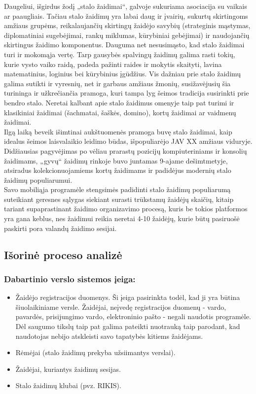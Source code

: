 \documentclass{VUMIFPSkursinis}
\begin{document}
Daugeliui, išgirdus žodį „stalo žaidimai“, galvoje sukuriama asociacija 
su vaikais ar paaugliais. Tačiau stalo žaidimų yra labai daug ir įvairių, 
sukurtų skirtingoms amžiaus grupėms, reikalaujančių skirtingų žaidėjo savybių 
(strateginis mąstymas, diplomatiniai sugebėjimai, rankų miklumas, kūrybiniai 
gebėjimai) ir naudojančių skirtingus žaidimo komponentus. Dauguma net nesusimąsto, 
kad stalo žaidimai turi ir mokomąja vertę. Tarp gausybės spalvingų žaidimų galima 
rasti tokių, kurie vysto vaiko raidą, padeda pažinti raides ir mokytis skaityti, 
lavina matematinius, loginius bei kūrybinius įgūdžius. Vis dažniau prie stalo 
žaidimų galima sutikti ir vyresnių, net ir garbaus amžiaus žmonių, susižavėjusių 
šia turininga ir užkrečiančia pramoga, kuri tampa lyg šeimos tradicija susirinkti 
prie bendro stalo. Neretai kalbant apie stalo žaidimus omenyje taip pat turimi ir 
klasikiniai žaidimai (šachmatai, šaškės, domino), kortų žaidimai ar vaidmenų žaidimai.\\
Ilgą laiką beveik išimtinai aukštuomenės pramoga buvę stalo žaidimai, kaip idealus 
šeimos laisvalaikio leidimo būdas, išpopuliarėjo JAV XX amžiaus viduryje. 
Didžiausias pagyvėjimas po vėliau prarastų pozicijų kompiuteriniams ir konsolių 
žaidimams, „gyvų“ žaidimų rinkoje buvo juntamas 9-ajame dešimtmetyje, atsiradus 
kolekcionuojamiems kortų žaidimams ir padidėjus modernių stalo žaidimų populiarumui.\\
Savo mobiliąja programėle stengsimės padidinti stalo žaidimų populiarumą suteikiant 
geresnes sąlygas siekiant surasti trūkstamų žaidėjų skaičių, kitaip tariant 
supaprastinant žaidimo organizavimo procesą, kuris be tokios platformos yra gana 
keblus, nes žaidimui reikia neretai 4-10 žaidėjų, kurie būtų pasiruošė paskirti 
pora valandų žaidimo sesijai.

\subsection{Išorinė proceso analizė}
	\subsubsection{Dabartinio verslo sistemos įeiga:}
		\renewcommand{\labelitemi}{$\bullet$}
			\begin{itemize}
				\item Žaidėjo registracijos duomenys. Ši įeiga pasirinkta todėl, 
				kad ji yra būtina šiuolaikiniame versle. Žaidėjai, neįvedę 
				registracijos duomenų - vardo, pavardės, prisijungimo vardo, 
				elektroninio pašto - negali naudotis programėle. Dėl saugumo tikslų 
				taip pat galima pateikti nuotrauką taip parodant, kad naudotojas 
				nebijo atskleisti savo tapatybės kitiems žaidėjams.
				\item Rėmėjai (stalo žaidimų prekyba užsiimantys verslai).
				\item Žaidėjai, kuriantys žaidimų sesijas.
				\item Stalo žaidimų klubai (pvz. RIKIS).
			\end{itemize}
\end{document}
